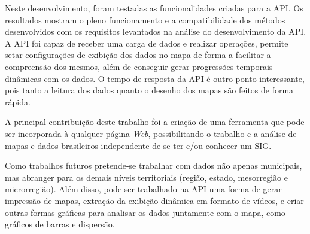 \documentclass[12pt]{article}
\begin{document}
Neste desenvolvimento, foram testadas as funcionalidades criadas para a API. Os resultados mostram o pleno funcionamento e a compatibilidade dos métodos desenvolvidos com os requisitos levantados na análise do desenvolvimento da API. A API foi capaz de receber uma carga de dados e realizar operações, permite setar configurações de exibição dos dados no mapa de forma a facilitar a compreensão dos mesmos, além de conseguir gerar progressões temporais dinâmicas com os dados. O tempo de resposta da API é outro ponto interessante, pois tanto a leitura dos dados quanto o desenho dos mapas são feitos de forma rápida.

A principal contribuição deste trabalho foi a criação de uma ferramenta que pode ser incorporada à qualquer página \emph{Web}, possibilitando o trabalho e a análise de mapas e dados brasileiros independente de se ter e/ou conhecer um SIG.

Como trabalhos futuros pretende-se trabalhar com dados não apenas municipais, mas abranger para os demais níveis territoriais (região, estado, mesorregião e microrregião). Além disso, pode ser trabalhado na API uma forma de gerar impressão de mapas, extração da exibição dinâmica em formato de vídeos, e criar outras formas gráficas para analisar os dados juntamente com o mapa, como gráficos de barras e dispersão.%

\newpage



\end{document}
